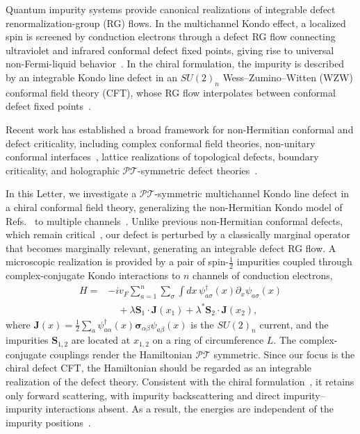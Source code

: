 \documentclass[aps,  prb,twocolumn,
  superscriptaddress,  floatfix,  10pt         
]{revtex4-2}
\begin{document}
\maketitle

Quantum impurity systems provide canonical realizations of integrable defect renormalization-group (RG) flows. In the multichannel Kondo effect, a localized spin is screened by conduction electrons through a defect RG flow connecting ultraviolet and infrared conformal defect fixed points, giving rise to universal non-Fermi-liquid behavior~\cite{wilson1975renormalization,andrei1983solution,tsvelick1983exact,affleck1995conformal,gaiotto2021integrable}. In the chiral formulation, the impurity is described by an integrable Kondo line defect in an $SU(2)_n$ Wess--Zumino--Witten (WZW) conformal field theory (CFT), whose RG flow interpolates between conformal defect fixed points~\cite{gaiotto2021integrable}.

Recent work has established a broad framework for non-Hermitian conformal and defect criticality, including complex conformal field theories, non-unitary conformal interfaces~\cite{furuta2026complex,tang2026exactly}, lattice realizations of topological defects, boundary criticality, and holographic $\mathscr{PT}$-symmetric defect theories~\cite{Liu2026ExtractingBC,sinha2026lattice,Maeda2026Holographic,castro2017irreversibility}.

In this Letter, we investigate a $\mathscr{PT}$-symmetric multichannel Kondo line defect in a chiral conformal field theory, generalizing the non-Hermitian Kondo model of Refs.~\cite{nakagawa2018non,kattel2025dissipation,kattel2025spin,kattel2026monotonic,burke2025non} to multiple channels~\cite{yi2026interplay,yi2026non}. Unlike previous non-Hermitian conformal defects, which remain critical~\cite{Maeda2026Holographic,sinha2026lattice,furuta2026complex}, our defect is perturbed by a classically marginal operator that becomes marginally relevant, generating an integrable defect RG flow. A microscopic realization is provided by a pair of spin-$\frac12$ impurities coupled through complex-conjugate Kondo interactions to $n$ channels of conduction electrons,
\begin{align}
H=& -i v_F \sum_{a=1}^{n}\sum_{\sigma} \int dx\, \psi^\dagger_{a\sigma}(x)\partial_x\psi_{a\sigma}(x)\nonumber\\
&\quad+\lambda\mathbf S_1\cdot\mathbf J(x_1)+\lambda^*\mathbf S_2\cdot\mathbf J(x_2),
\end{align}
where $\mathbf J(x)=\frac12\sum_a\psi^\dagger_{a\alpha}(x)\boldsymbol{\sigma}_{\alpha\beta}\psi_{a\beta}(x)$ is the $SU(2)_n$ current, and the impurities $\mathbf S_{1,2}$ are located at $x_{1,2}$ on a ring of circumference $L$. The complex-conjugate couplings render the Hamiltonian $\mathscr{PT}$ symmetric. Since our focus is the chiral defect CFT, the Hamiltonian should be regarded as an integrable realization of the defect theory. Consistent with the chiral formulation~\cite{affleck1995conformal,gaiotto2021integrable}, it retains only forward scattering, with impurity backscattering and direct impurity--impurity interactions absent. As a result, the energies are independent of the impurity positions~\cite{andrei1980diagonalization}.
\end{document}
